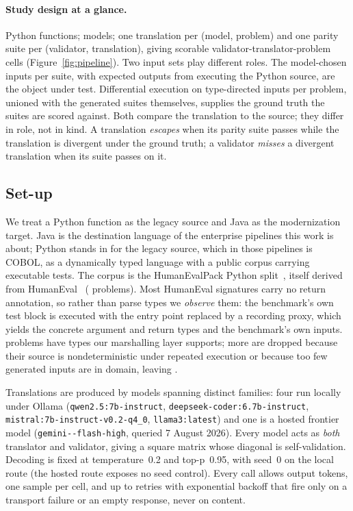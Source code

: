 \documentclass[sigconf]{acmart}
\begin{document}
\paragraph{Study design at a glance.}
\NProblems{} Python functions; \NModels{} models; one translation per (model, problem) and one
parity suite per (validator, translation), giving \NCells{} scorable validator-translator-problem cells
(Figure~\ref{fig:pipeline}). Two input sets play different roles. The \KParity{} model-chosen
inputs per suite, with expected outputs from executing the Python source, are the object under
test. Differential execution on \NFuzz{} type-directed inputs per
problem, unioned with the generated suites themselves, supplies the ground truth the suites are
scored against. Both compare the translation to the source; they differ in role, not in kind. A
translation \emph{escapes} when its parity suite passes while the translation is divergent
under the ground truth; a validator \emph{misses} a divergent translation when its suite passes
on it.

\subsection{Set-up}

We treat a Python function as the legacy source and Java as the modernization target. Java is
the destination language of the enterprise pipelines this work is about; Python stands in for
the legacy source, which in those pipelines is COBOL, as a dynamically typed language with a
public corpus carrying executable tests. The corpus is the HumanEvalPack Python
split~\cite{muennighoff2024octopack}, itself derived from HumanEval~\cite{chen2021codex}
(\NHumanEval{} problems). Most HumanEval signatures carry no return annotation, so rather than
parse types we \emph{observe} them: the benchmark's own test block is executed with the entry
point replaced by a recording proxy, which yields the concrete argument and return types and the
benchmark's own inputs. \NSigEligible{} problems have types our marshalling layer supports;
\NDropped{} more are dropped because their source is nondeterministic under repeated execution or
because too few generated inputs are in domain, leaving \NProblems{}.

Translations are produced by \NModels{} models spanning distinct families: four run locally
under Ollama (\texttt{qwen2.5:\allowbreak 7b-\allowbreak instruct},
\texttt{deepseek-\allowbreak coder:\allowbreak 6.7b-\allowbreak instruct},
\texttt{mistral:\allowbreak 7b-\allowbreak instruct-\allowbreak v0.2-\allowbreak q4\_0},
\texttt{llama3:\allowbreak latest}) and one is a hosted frontier model
(\texttt{gemini--\allowbreak flash-\allowbreak high}, queried 7 August 2026).
Every model acts as \emph{both}
translator and validator, giving a square matrix whose diagonal is self-validation. Decoding is
fixed at temperature~0.2 and top-p~0.95, with seed~0 on the local route (the hosted route
exposes no seed control). Every call allows \MaxTokensPerCall{} output tokens, one sample per
cell, and up to \CallRetries{} retries with exponential backoff that fire only on a transport
failure or an empty response, never on content.
\end{document}

